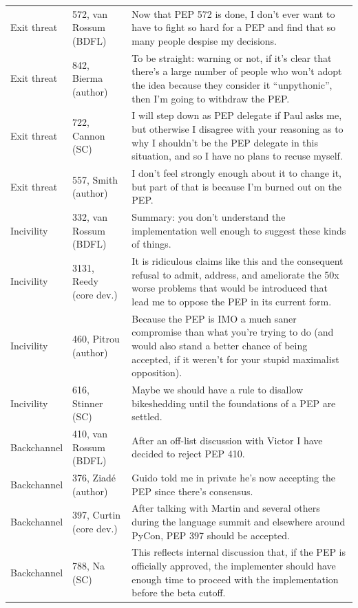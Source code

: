 \documentclass[sigconf,screen]{acmart}
\begin{document}
\begin{table}[t]
\begin{tabular}{p{}p{}p{}}
Exit threat & 572, van Rossum (BDFL) & Now that PEP 572 is done, I don't ever want to have to fight so hard for a PEP and find that so many people despise my decisions. \\
Exit threat & 842, Bierma (author) & To be straight: warning or not, if it's clear that there's a large number of people who won't adopt the idea because they consider it ``unpythonic'', then I'm going to withdraw the PEP. \\
Exit threat & 722, Cannon (SC) & I will step down as PEP delegate if Paul asks me, but otherwise I disagree with your reasoning as to why I shouldn't be the PEP delegate in this situation, and so I have no plans to recuse myself. \\
Exit threat & 557, Smith (author) & I don't feel strongly enough about it to change it, but part of that is because I'm burned out on the PEP. \\
Incivility & 332, van Rossum (BDFL) & Summary: you don't understand the implementation well enough to suggest these kinds of things. \\
Incivility & 3131, Reedy (core dev.) & It is ridiculous claims like this and the consequent refusal to admit, address, and ameliorate the 50x worse problems that would be introduced that lead me to oppose the PEP in its current form. \\
Incivility & 460, Pitrou (author) & Because the PEP is IMO a much saner compromise than what you're trying to do (and would also stand a better chance of being accepted, if it weren't for your stupid maximalist opposition). \\
Incivility & 616, Stinner (SC) & Maybe we should have a rule to disallow bikeshedding until the foundations of a PEP are settled. \\
Backchannel & 410, van Rossum (BDFL) & After an off-list discussion with Victor I have decided to reject PEP 410. \\
Backchannel & 376, Ziad\'e (author) & Guido told me in private he's now accepting the PEP since there's consensus. \\
Backchannel & 397, Curtin (core dev.) & After talking with Martin and several others during the language summit and elsewhere around PyCon, PEP 397 should be accepted. \\
Backchannel & 788, Na (SC) & This reflects internal discussion that, if the PEP is officially approved, the implementer should have enough time to proceed with the implementation before the beta cutoff. \\

\end{tabular}
\end{table}
\end{document}
